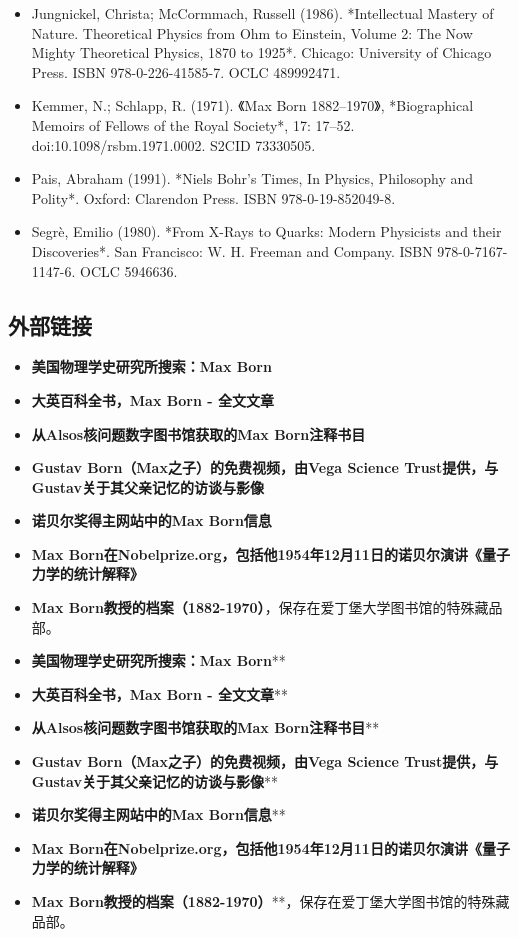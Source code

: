 \begin{itemize}
\item Jungnickel, Christa; McCormmach, Russell (1986). *Intellectual Mastery of Nature. Theoretical Physics from Ohm to Einstein, Volume 2: The Now Mighty Theoretical Physics, 1870 to 1925*. Chicago: University of Chicago Press. ISBN 978-0-226-41585-7. OCLC 489992471.
\item Kemmer, N.; Schlapp, R. (1971). 《Max Born 1882–1970》, *Biographical Memoirs of Fellows of the Royal Society*, 17: 17–52. doi:10.1098/rsbm.1971.0002. S2CID 73330505.
\item Pais, Abraham (1991). *Niels Bohr's Times, In Physics, Philosophy and Polity*. Oxford: Clarendon Press. ISBN 978-0-19-852049-8.
\item Segrè, Emilio (1980). *From X-Rays to Quarks: Modern Physicists and their Discoveries*. San Francisco: W. H. Freeman and Company. ISBN 978-0-7167-1147-6. OCLC 5946636.
\end{itemize}
\subsection{外部链接}
\begin{itemize}
\item \textbf{美国物理学史研究所搜索：Max Born}
\item \textbf{大英百科全书，Max Born - 全文文章}
\item \textbf{从Alsos核问题数字图书馆获取的Max Born注释书目}
\item \textbf{Gustav Born（Max之子）的免费视频，由Vega Science Trust提供，与Gustav关于其父亲记忆的访谈与影像}
\item \textbf{诺贝尔奖得主网站中的Max Born信息}
\item \textbf{Max Born在Nobelprize.org，包括他1954年12月11日的诺贝尔演讲《量子力学的统计解释》}
\item \textbf{Max Born教授的档案（1882-1970）}，保存在爱丁堡大学图书馆的特殊藏品部。
\item \textbf{美国物理学史研究所搜索：Max Born}**
\item \textbf{大英百科全书，Max Born - 全文文章}**
\item \textbf{从Alsos核问题数字图书馆获取的Max Born注释书目}**
\item \textbf{Gustav Born（Max之子）的免费视频，由Vega Science Trust提供，与Gustav关于其父亲记忆的访谈与影像}**
\item \textbf{诺贝尔奖得主网站中的Max Born信息}**
\item \textbf{Max Born在Nobelprize.org，包括他1954年12月11日的诺贝尔演讲《量子力学的统计解释》}
\item \textbf{Max Born教授的档案（1882-1970）}**，保存在爱丁堡大学图书馆的特殊藏品部。
\end{itemize}
